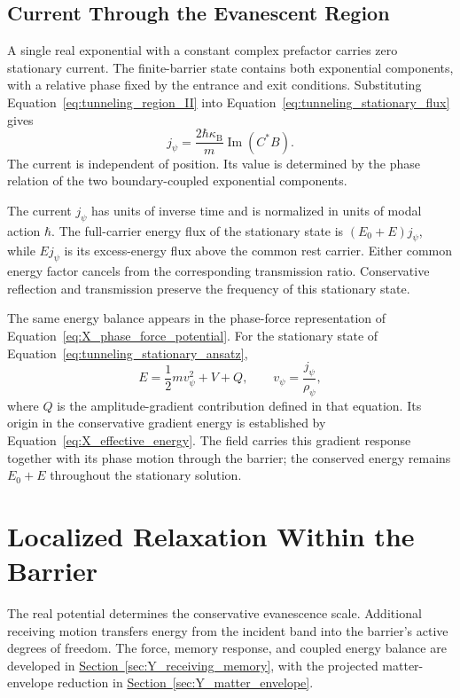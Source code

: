 \subsection{Current Through the Evanescent Region}

A single real exponential with a constant complex prefactor carries zero stationary current. The finite-barrier state contains both exponential components, with a relative phase fixed by the entrance and exit conditions. Substituting Equation~\eqref{eq:tunneling_region_II} into Equation~\eqref{eq:tunneling_stationary_flux} gives
\begin{equation}
    \boxed{
    j_\psi
    =\frac{2\hbar\kappa_{\mathrm B}}{m}
    \operatorname{Im}(C^*B)
    }.
\end{equation}
The current is independent of position. Its value is determined by the phase relation of the two boundary-coupled exponential components.

The current $j_\psi$ has units of inverse time and is normalized in units of modal action $\hbar$. The full-carrier energy flux of the stationary state is $(E_0+E)j_\psi$, while $Ej_\psi$ is its excess-energy flux above the common rest carrier. Either common energy factor cancels from the corresponding transmission ratio. Conservative reflection and transmission preserve the frequency of this stationary state.

The same energy balance appears in the phase-force representation of Equation~\eqref{eq:X_phase_force_potential}. For the stationary state of Equation~\eqref{eq:tunneling_stationary_ansatz},
\begin{equation}
    \boxed{
    E=\frac12m v_\psi^2+V+Q
    },
    \qquad v_\psi=\frac{j_\psi}{\rho_\psi},
\end{equation}
where $Q$ is the amplitude-gradient contribution defined in that equation. Its origin in the conservative gradient energy is established by Equation~\eqref{eq:X_effective_energy}. The field carries this gradient response together with its phase motion through the barrier; the conserved energy remains $E_0+E$ throughout the stationary solution.

\section{Localized Relaxation Within the Barrier}
\label{sec:tunneling_localized_relaxation}

The real potential determines the conservative evanescence scale. Additional receiving motion transfers energy from the incident band into the barrier's active degrees of freedom. The force, memory response, and coupled energy balance are developed in \hyperref[sec:Y_receiving_memory]{Section~\ref*{sec:Y_receiving_memory}}, with the projected matter-envelope reduction in \hyperref[sec:Y_matter_envelope]{Section~\ref*{sec:Y_matter_envelope}}.

